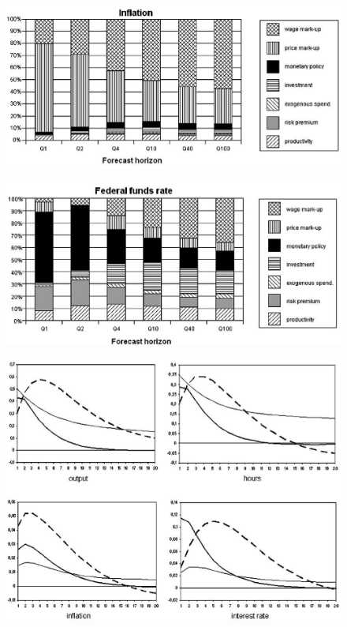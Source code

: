 \documentclass{beamer}
\begin{document}
\begin{frame}
  \begin{figure}
    \includegraphics{sw_figure1_inflation.eps}
  \end{figure}
\end{frame}

\begin{frame}
  \begin{figure}
    \includegraphics{sw_figure1_interest.eps}
  \end{figure}
\end{frame}

\begin{frame}
  \begin{figure}
    \includegraphics{sw_figure2.eps}
  \end{figure}
\end{frame}
\end{document}
